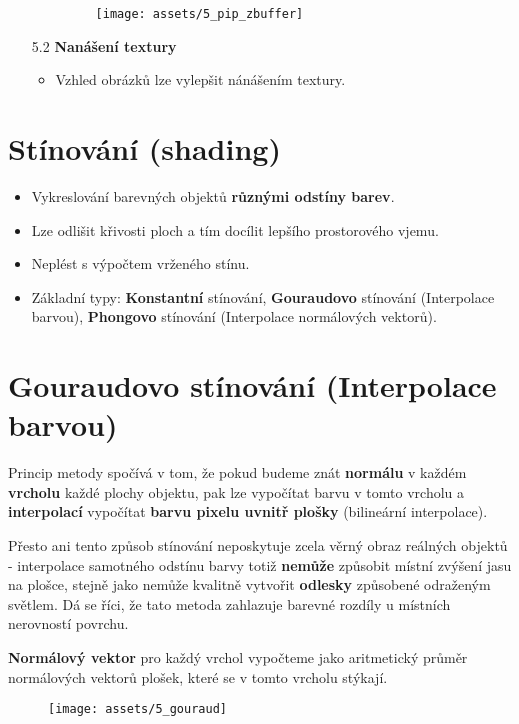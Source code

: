 \begin{enumerate}
\begin{itemize}
                    \begin{figure}[H]
                        \centering
                        \texttt{[image: assets/5\_pip\_zbuffer]}
                    \end{figure}
          \end{itemize}
    \item[5.2] \textbf{Nanášení textury}
          \begin{itemize}
              \item Vzhled obrázků lze vylepšit nánášením textury.
          \end{itemize}
\end{enumerate}

\section{Stínování (shading)}
\begin{itemize}
    \item Vykreslování barevných objektů \textbf{různými odstíny barev}.
    \item Lze odlišit křivosti ploch a tím docílit lepšího prostorového vjemu.
    \item Neplést s výpočtem vrženého stínu.
    \item Základní typy: \textbf{Konstantní} stínování, \textbf{Gouraudovo} stínování (Interpolace barvou), \textbf{Phongovo} stínování (Interpolace normálových vektorů).
\end{itemize}
\section{Gouraudovo stínování (Interpolace barvou)}
Princip metody spočívá v tom, že pokud budeme znát \textbf{normálu} v každém \textbf{vrcholu} každé plochy objektu, pak lze vypočítat barvu v tomto vrcholu a \textbf{interpolací} vypočítat \textbf{barvu pixelu uvnitř plošky} (bilineární interpolace).

Přesto ani tento způsob stínování neposkytuje zcela věrný obraz reálných objektů - interpolace samotného odstínu barvy totiž \textbf{nemůže} způsobit místní zvýšení jasu na plošce, stejně jako nemůže kvalitně vytvořit \textbf{odlesky} způsobené odraženým světlem. Dá se říci, že tato metoda zahlazuje barevné rozdíly u místních nerovností povrchu.

\textbf{Normálový vektor} pro každý vrchol vypočteme jako aritmetický průměr normálových vektorů plošek, které se v tomto vrcholu stýkají.
\begin{figure}[H]
    \centering
    \texttt{[image: assets/5\_gouraud]}
\end{figure}


